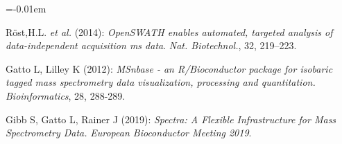 \documentclass{article}
\begin{document}
\begin{multicols}{2}
\noindent
\begin{minipage}[t]{.8\linewidth}

  \vspace{1cm}

  \small

  
  \begin{thebibliography}{1}
    \itemsep=-0.01em
    \setlength{\baselineskip}{0.4em}

   Röst,H.L. \textit{et al.} (2014):
    \emph{OpenSWATH enables automated, targeted analysis of
      data-independent acquisition ms
      data}. \textit{Nat. Biotechnol.}, 32, 219–223.

   Gatto L, Lilley K (2012): \emph{MSnbase - an
    R/Bioconductor package for isobaric tagged mass spectrometry data
    visualization, processing and quantitation.}
    \textit{Bioinformatics}, 28, 288-289.
    
    Gibb S, Gatto L, Rainer J (2019): \emph{Spectra: A Flexible Infrastructure for Mass Spectrometry Data.}
    \textit{European Bioconductor Meeting 2019}.
  \end{thebibliography}

\end{minipage}




\end{multicols}
\end{document}
